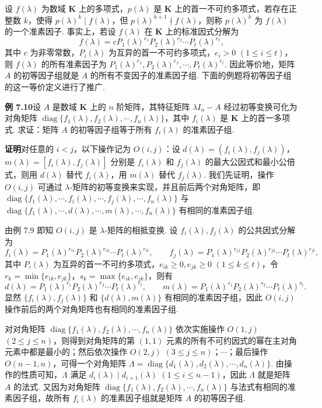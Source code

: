 \documentclass[UTF8,12pt,a4paper,fontset=fandol]{ctexart}
\begin{document}
设 $f(\lambda)$ 为数域 $\mathbf{K}$ 上的多项式，$p(\lambda)$ 是 $\mathbf{K}$ 上的首一不可约多项式，若存在正整数 $k$，使得 $p(\lambda)^k\mid f(\lambda)$，但 $p(\lambda)^{k+1}\nmid f(\lambda)$，则称 $p(\lambda)^k$ 为 $f(\lambda)$ 的一个准素因子. 事实上，若设 $f(\lambda)$ 在 $\mathbf{K}$ 上的标准因式分解为
\[
f(\lambda)=cP_1(\lambda)^{e_1}P_2(\lambda)^{e_2}\cdots P_t(\lambda)^{e_t},
\]
其中 $c$ 为非零常数，$P_i(\lambda)$ 为互异的首一不可约多项式，$e_i>0$ $(1\le i\le t)$，则 $f(\lambda)$ 的所有准素因子为 $P_1(\lambda)^{e_1},P_2(\lambda)^{e_2},\cdots,P_t(\lambda)^{e_t}$. 因此等价地，矩阵 $A$ 的初等因子组就是 $A$ 的所有不变因子的准素因子组. 下面的例题将初等因子组的这一等价定义进行了推广.

\noindent\textbf{例 7.10}\quad 设 $A$ 是数域 $\mathbf{K}$ 上的 $n$ 阶矩阵，其特征矩阵 $\lambda I_n-A$ 经过初等变换可化为对角矩阵 $\operatorname{diag}\{f_1(\lambda),f_2(\lambda),\cdots,f_n(\lambda)\}$，其中 $f_i(\lambda)$ 是 $\mathbf{K}$ 上的首一多项式. 求证：矩阵 $A$ 的初等因子组等于所有 $f_i(\lambda)$ 的准素因子组.

\noindent\textbf{证明}\quad 对任意的 $i<j$，以下操作记为 $O(i,j)$：设 $d(\lambda)=(f_i(\lambda),f_j(\lambda))$，$m(\lambda)=[f_i(\lambda),f_j(\lambda)]$ 分别是 $f_i(\lambda)$ 和 $f_j(\lambda)$ 的最大公因式和最小公倍式，则用 $d(\lambda)$ 替代 $f_i(\lambda)$，用 $m(\lambda)$ 替代 $f_j(\lambda)$. 我们先证明，操作 $O(i,j)$ 可通过 $\lambda$-矩阵的初等变换来实现，并且前后两个对角矩阵，即 $\operatorname{diag}\{f_1(\lambda),\cdots,f_i(\lambda),\cdots,f_j(\lambda),\cdots,f_n(\lambda)\}$ 与 $\operatorname{diag}\{f_1(\lambda),\cdots,d(\lambda),\cdots,m(\lambda),\cdots,f_n(\lambda)\}$ 有相同的准素因子组.

由例 7.9 即知 $O(i,j)$ 是 $\lambda$-矩阵的相抵变换. 设 $f_i(\lambda),f_j(\lambda)$ 的公共因式分解为
\[
f_i(\lambda)=P_1(\lambda)^{e_{i1}}P_2(\lambda)^{e_{i2}}\cdots P_t(\lambda)^{e_{it}},\qquad
f_j(\lambda)=P_1(\lambda)^{e_{j1}}P_2(\lambda)^{e_{j2}}\cdots P_t(\lambda)^{e_{jt}},
\]
其中 $P_i(\lambda)$ 为互异的首一不可约多项式，$e_{ik}\ge 0,e_{jk}\ge 0$ $(1\le k\le t)$，令 $r_k=\min\{e_{ik},e_{jk}\}$，$s_k=\max\{e_{ik},e_{jk}\}$，则有
\[
d(\lambda)=P_1(\lambda)^{r_1}P_2(\lambda)^{r_2}\cdots P_t(\lambda)^{r_t},\qquad
m(\lambda)=P_1(\lambda)^{s_1}P_2(\lambda)^{s_2}\cdots P_t(\lambda)^{s_t}.
\]
显然 $\{f_i(\lambda),f_j(\lambda)\}$ 和 $\{d(\lambda),m(\lambda)\}$ 有相同的准素因子组，因此 $O(i,j)$ 操作前后的两个对角矩阵也有相同的准素因子组.

对对角矩阵 $\operatorname{diag}\{f_1(\lambda),f_2(\lambda),\cdots,f_n(\lambda)\}$ 依次实施操作 $O(1,j)$ $(2\le j\le n)$，则得到对角矩阵的第 $(1,1)$ 元素的所有不可约因式的幂在主对角元素中都是最小的；然后依次操作 $O(2,j)$ $(3\le j\le n)$；$\cdots$；最后操作 $O(n-1,n)$，可得一个对角矩阵 $\Lambda=\operatorname{diag}\{d_1(\lambda),d_2(\lambda),\cdots,d_n(\lambda)\}$. 由操作的性质可知，$\Lambda$ 满足 $d_i(\lambda)\mid d_{i+1}(\lambda)$ $(1\le i\le n-1)$，因此 $\Lambda$ 就是矩阵 $A$ 的法式. 又因为对角矩阵 $\operatorname{diag}\{f_1(\lambda),f_2(\lambda),\cdots,f_n(\lambda)\}$ 与法式有相同的准素因子组，故所有 $f_i(\lambda)$ 的准素因子组就是矩阵 $A$ 的初等因子组.
\end{document}
